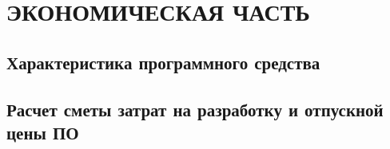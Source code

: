 \section{ЭКОНОМИЧЕСКАЯ ЧАСТЬ}
\subsection{Характеристика программного средства}
\subsection{Расчет сметы затрат на разработку и отпускной цены ПО}
